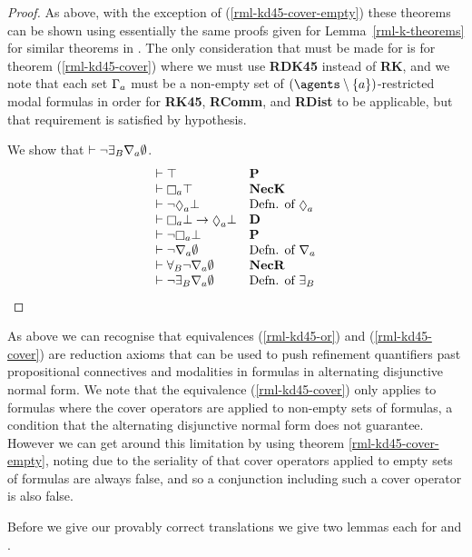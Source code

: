 \begin{proof}
As above, with the exception of (\ref{rml-kd45-cover-empty}) these theorems can be shown using essentially the same proofs given for Lemma~\ref{rml-k-theorems} for similar theorems in \axiomRmlK{}.
The only consideration that must be made for \axiomRmlKD{} is for theorem (\ref{rml-kd45-cover}) where we must use {\bf RDK45} instead of {\bf RK}, and we note that each set $\Gamma_a$ must be a non-empty set of $(\agents \setminus \{\agentA\})$-restricted modal formulas in order for {\bf RK45}, {\bf RComm}, and {\bf RDist} to be applicable, but that requirement is satisfied by hypothesis.

We show that $\vdash \lnot {\exists_{B}} \nabla_{a} \emptyset$.
$$
\begin{array}{ll}
    \proves \top & {\bf P}\\
    \proves \necessaryA \top & {\bf NecK}\\
    \proves \lnot \possibleA \bot & \text{Defn. of $\possibleA$}\\
    \proves \necessaryA \bot \implies \possibleA \bot & {\bf D}\\
    \proves \lnot \necessaryA \bot & {\bf P}\\
    \proves \lnot \coversA \emptyset & \text{Defn. of $\coversA$}\\
    \proves \allrefsBs \lnot \coversA \emptyset & {\bf NecR}\\
    \proves \lnot \somerefsBs \coversA \emptyset & \text{Defn. of $\somerefsBs$}
\end{array}
$$
\end{proof}

As above we can recognise that equivalences (\ref{rml-kd45-or}) and (\ref{rml-kd45-cover}) are reduction axioms that can be used to push refinement quantifiers past propositional connectives and modalities in formulas in alternating disjunctive normal form.
We note that the equivalence (\ref{rml-kd45-cover}) only applies to formulas where the cover operators are applied to non-empty sets of formulas, a condition that the alternating disjunctive normal form does not guarantee.
However we can get around this limitation by using theorem \ref{rml-kd45-cover-empty}, noting due to the seriality of \classKD{} that cover operators applied to empty sets of formulas are always false, and so a conjunction including such a cover operator is also false.

Before we give our provably correct translations we give two lemmas each for \axiomRmlKFF{} and \axiomRmlKD{}.

